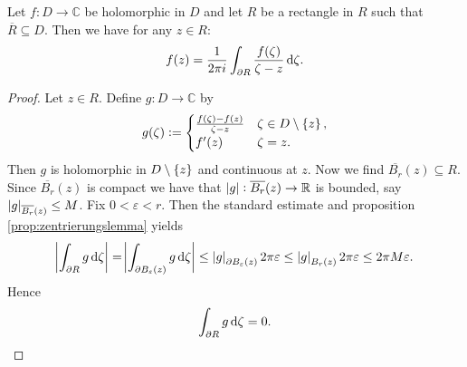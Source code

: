\begin{enumerate}[label = \textbf{Exercise \arabic*.},wide = 0pt, itemsep=1.5ex]
		\begin{theorem}
			Let $f: D \to \mathbb{C}$ be holomorphic in $D$ and let $R$ be a rectangle in $R$ such that $\overline{R} \subseteq D$. Then we have for any $z \in R$:
			\begin{equation}
				f(z) = \frac{1}{2\pi i}\int_{\partial R}\frac{f(\zeta)}{\zeta - z} \mathop{}\!\mathrm{d} \zeta.
			\end{equation}
		\end{theorem}

		\begin{proof}
			Let $z \in R$. Define $g: D \to \mathbb{C}$ by  
			\begin{align}
				g(\zeta) := \begin{cases}
					\frac{f(\zeta) - f(z)}{\zeta - z} & \zeta \in D \setminus \cbr[0]{z},\\
					f'(z) & \zeta = z.
				\end{cases}
			\end{align}
			Then $g$ is holomorphic in $D\setminus \cbr[0]{z}$ and continuous at $z$. Now we find $\overline{B_r}(z) \subseteq R$. Since $\overline{B_r}(z)$ is compact we have that $\abs[0]{g} : \overline{B_r}(z) \to \mathbb{R}$ is bounded, say $\abs[0]{g}_{\overline{B_r}(z)} \leq M$. Fix $0 < \varepsilon < r$. Then the standard estimate and proposition \ref{prop:zentrierungslemma} yields
			\begin{equation}
				\abs[3]{\int_{\partial R}g \d \zeta} = \abs[3]{\int_{\partial B_\varepsilon(z)} g \d \zeta} \leq \abs[0]{g}_{\partial B_\varepsilon(z)}2\pi\varepsilon \leq \abs[0]{g}_{B_r(z)}2\pi\varepsilon \leq 2\pi M \varepsilon.
			\end{equation}
			Hence 
			\begin{equation}
				\int_{\partial R}g \mathop{}\!\mathrm{d} \zeta = 0.
				\label{eq:intg0}
			\end{equation}


\end{proof}
\end{enumerate}

